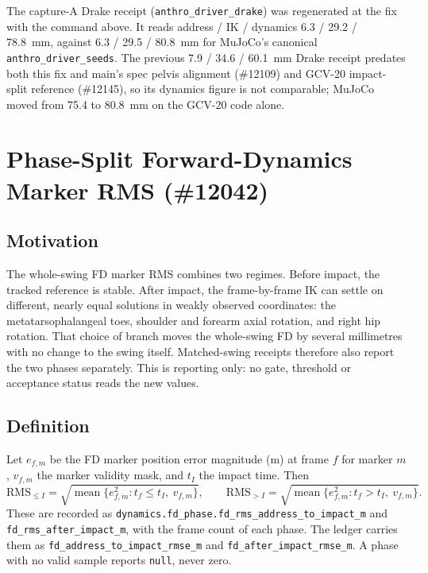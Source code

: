 \documentclass[11pt,a4paper]{article}
\begin{document}
The capture-A Drake receipt (\texttt{anthro\_driver\_drake}) was regenerated
at the fix with the command above. It reads address / IK / dynamics
6.3 / 29.2 / 78.8~mm, against 6.3 / 29.5 / 80.8~mm for MuJoCo's canonical
\texttt{anthro\_driver\_seeds}. The previous 7.9 / 34.6 / 60.1~mm Drake receipt
predates both this fix and main's spec pelvis alignment (\#12109) and GCV-20
impact-split reference (\#12145), so its dynamics figure is not comparable;
MuJoCo moved from 75.4 to 80.8~mm on the GCV-20 code alone.
\section{Phase-Split Forward-Dynamics Marker RMS (\#12042)}
\label{sec:fd_phase_split}

\subsection{Motivation}
The whole-swing FD marker RMS combines two regimes. Before impact, the
tracked reference is stable. After impact, the frame-by-frame IK can settle
on different, nearly equal solutions in weakly observed coordinates: the
metatarsophalangeal toes, shoulder and forearm axial rotation, and right hip
rotation. That choice of branch moves the whole-swing FD by several
millimetres with no change to the swing itself. Matched-swing receipts
therefore also report the two phases separately. This is reporting only: no
gate, threshold or acceptance status reads the new values.

\subsection{Definition}
Let $e_{f,m}$ be the FD marker position error magnitude (m) at frame $f$ for
marker $m$, $v_{f,m}$ the marker validity mask, and $t_I$ the impact time. Then
\[
  \mathrm{RMS}_{\le I} = \sqrt{\operatorname{mean}\{e_{f,m}^2 : t_f \le t_I,\ v_{f,m}\}},
  \qquad
  \mathrm{RMS}_{> I} = \sqrt{\operatorname{mean}\{e_{f,m}^2 : t_f > t_I,\ v_{f,m}\}}.
\]
These are recorded as \texttt{dynamics.fd\_phase.fd\_rms\_address\_to\_impact\_m}
and \texttt{fd\_rms\_after\_impact\_m}, with the frame count of each phase. The
ledger carries them as \texttt{fd\_address\_to\_impact\_rmse\_m} and
\texttt{fd\_after\_impact\_rmse\_m}. A phase with no valid sample reports
\texttt{null}, never zero.
\end{document}
